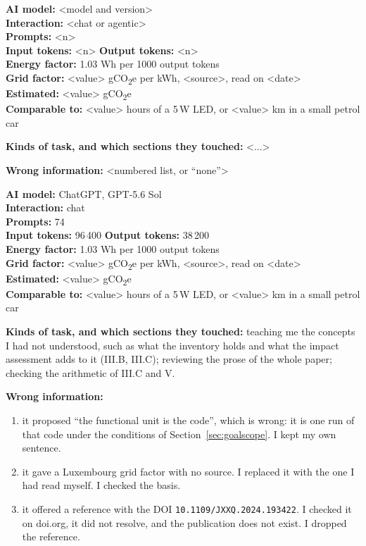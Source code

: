 \documentclass[conference,a4paper]{IEEEtran}
\newif\ifguidance
\begin{document}
\ifguidance
\noindent\textbf{AI model:} <model and version> \\
\textbf{Interaction:} <chat or agentic> \\
\textbf{Prompts:} <n> \\
\textbf{Input tokens:} <n> \quad \textbf{Output tokens:} <n> \\
\textbf{Energy factor:} 1.03 Wh per 1000 output tokens \\
\textbf{Grid factor:} <value> gCO\textsubscript{2}e per kWh, <source>, read on
<date> \\
\textbf{Estimated:} <value> gCO\textsubscript{2}e \\
\textbf{Comparable to:} <value> hours of a 5\,W LED, or <value> km in a small
petrol car

\textbf{Kinds of task, and which sections they touched:} <...>

\textbf{Wrong information:} <numbered list, or ``none''>


\noindent\textbf{AI model:} ChatGPT, GPT-5.6 Sol \\
\textbf{Interaction:} chat \\
\textbf{Prompts:} 74 \\
\textbf{Input tokens:} 96\,400 \quad \textbf{Output tokens:} 38\,200 \\
\textbf{Energy factor:} 1.03 Wh per 1000 output tokens \\
\textbf{Grid factor:} <value> gCO\textsubscript{2}e per kWh, <source>, read on
<date> \\
\textbf{Estimated:} <value> gCO\textsubscript{2}e \\
\textbf{Comparable to:} <value> hours of a 5\,W LED, or <value> km in a small
petrol car

\textbf{Kinds of task, and which sections they touched:} teaching me the concepts
I had not understood, such as what the inventory holds and what the impact
assessment adds to it (III.B, III.C); reviewing the prose of the whole paper;
checking the arithmetic of III.C and V.

\textbf{Wrong information:}
\begin{enumerate}
\item it proposed ``the functional unit is the code'', which is wrong: it is one
  run of that code under the conditions of Section~\ref{sec:goalscope}. I kept my
  own sentence.
\item it gave a Luxembourg grid factor with no source. I replaced it with the
  one I had read myself. I checked the basis.
\item it offered a reference with the DOI \texttt{10.1109/JXXQ.2024.193422}. I
  checked it on doi.org, it did not resolve, and the publication does not
  exist. I dropped the reference.
\end{enumerate}
\end{document}
